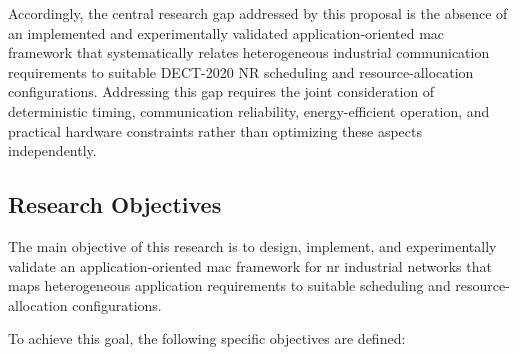 \documentclass[12pt,a4paper]{article}
\begin{document}
Accordingly, the central research gap addressed by this proposal is the absence of an implemented and experimentally validated application-oriented \gls{mac} framework that systematically relates heterogeneous industrial communication requirements to suitable DECT-2020 NR scheduling and resource-allocation configurations. Addressing this gap requires the joint consideration of deterministic timing, communication reliability, energy-efficient operation, and practical hardware constraints rather than optimizing these aspects independently.


\subsection{Research Objectives}
\label{subsec:research_objectives}

The main objective of this research is to design, implement, and experimentally
validate an application-oriented \gls{mac} framework for \gls{nr} industrial
networks that maps heterogeneous application requirements to suitable scheduling
and resource-allocation configurations.

To achieve this goal, the following specific objectives are defined:
\end{document}
